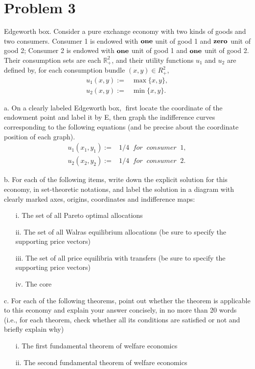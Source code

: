 \documentclass[12pt,notitlepage]{article}%
\numberwithin{equation}{section}
\begin{document}
\section{Problem 3}
Edgeworth box. Consider a pure exchange economy with two kinds of goods and two consumers. Consumer 1 is endowed with $\bf{one}$ unit of good 1 and $\bf{zero}$ unit of good 2; Consumer 2 is endowed with $\bf{one}$ unit of good 1 and $\bf{one}$ unit of good 2. Their consumption sets are each $\mathbb R_{+}^2$, and their utility functions $u_1$ and $u_2$ are defined by, for each consumption bundle $(x,y)\in R_{+}^2$,
\begin{equation}
\begin{split}
u_1(x,y):=&\max\{x,y\},\\
u_2(x,y):=&\min\{x,y\}.
\end{split}
\end{equation}
 
 a. On a clearly labeled Edgeworth box, first locate the coordinate of the endowment point
and label it by E, then graph the indifference curves corresponding to the following
equations (and be precise about the coordinate position of each graph).
 \begin{equation}
 \begin{split}
 u_1(x_1,y_1):=&1/4 \;\;for\;\; consumer \;\;1,\\
 u_2(x_2,y_2):=&1/4 \;\;for\;\; consumer \;\;2.
 \end{split}
 \end{equation}
 
 

b. For each of the following items, write down the explicit solution for this economy, in
set-theoretic notations, and label the solution in a diagram with clearly marked axes,
origins, coordinates and indifference maps:
\begin{itemize}
	\item[i.] The set of all Pareto optimal allocations
	\item[ii.] The set of all Walras equilibrium allocations (be sure to specify the supporting price vectors)
	\item[iii.] The set of all price equilibria with transfers (be sure to specify the supporting
	price vectors)
	\item[iv.] The core
\end{itemize}


c. For each of the following theorems, point out whether the theorem is applicable to this
economy and explain your answer concisely, in no more than 20 words (i.e., for each
theorem, check whether all its conditions are satisfied or not and briefly explain why)
\begin{itemize}
	\item[i.] The first fundamental theorem of welfare economics
	\item[ii.] The second fundamental theorem of welfare economics
\end{itemize}
\end{document}
